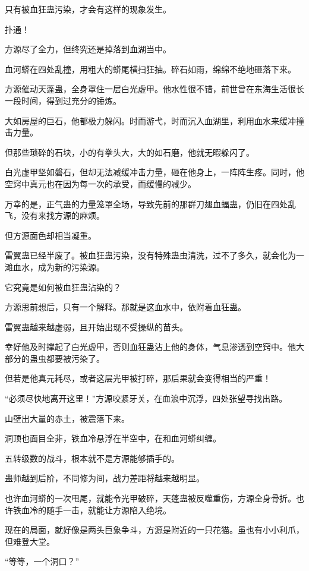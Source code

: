 \begin{this_body}
只有被血狂蛊污染，才会有这样的现象发生。

扑通！

方源尽了全力，但终究还是掉落到血湖当中。

血河蟒在四处乱撞，用粗大的蟒尾横扫狂抽。碎石如雨，绵绵不绝地砸落下来。

方源催动天蓬蛊，全身罩住一层白光虚甲。他水性很不错，前世曾在东海生活很长一段时间，得到过充分的锤炼。

大如房屋的巨石，他都极力躲闪。时而游弋，时而沉入血湖里，利用血水来缓冲撞击力量。

但那些琐碎的石块，小的有拳头大，大的如石磨，他就无暇躲闪了。

白光虚甲坚如磐石，但却无法减缓冲击力量，砸在他身上，一阵阵生疼。同时，他空窍中真元也在因为每一次的承受，而缓慢的减少。

万幸的是，正气蛊的力量笼罩全场，导致先前的那群刀翅血蝠蛊，仍旧在四处乱飞，没有来找方源的麻烦。

但方源面色却相当凝重。

雷翼蛊已经半废了。被血狂蛊污染，没有特殊蛊虫清洗，过不了多久，就会化为一滩血水，成为新的污染源。

它究竟是如何被血狂蛊沾染的？

方源思前想后，只有一个解释。那就是这血水中，依附着血狂蛊。

雷翼蛊越来越虚弱，且开始出现不受操纵的苗头。

幸好他及时撑起了白光虚甲，否则血狂蛊沾上他的身体，气息渗透到空窍中。他大部分的蛊虫都要被污染了。

但若是他真元耗尽，或者这层光甲被打碎，那后果就会变得相当的严重！

“必须尽快地离开这里！”方源咬紧牙关，在血浪中沉浮，四处张望寻找出路。

山壁出大量的赤土，被震落下来。

洞顶也面目全非，铁血冷悬浮在半空中，在和血河蟒纠缠。

五转级数的战斗，根本就不是方源能够插手的。

蛊师越到后阶，不同修为间，战力差距将越来越明显。

也许血河蟒的一次甩尾，就能令光甲破碎，天蓬蛊被反噬重伤，方源全身骨折。也许铁血冷的随手一击，就能让方源陷入绝境。

现在的局面，就好像是两头巨象争斗，方源是附近的一只花猫。虽也有小小利爪，但难登大堂。

“等等，一个洞口？”

\end{this_body}


